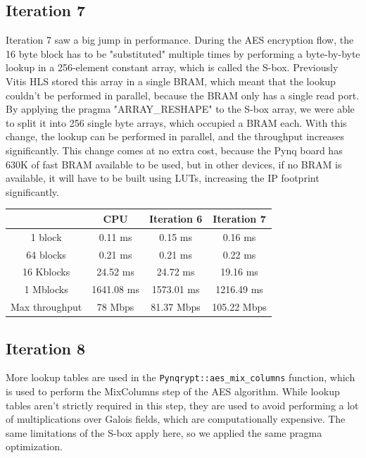 \documentclass[12pt,oneside,a4paper]{article}
\begin{document}
\subsection{Iteration 7} \label{subsec:iter7}
Iteration 7 saw a big jump in performance. 
During the AES encryption flow, the 16 byte block has to be "substituted" multiple times by performing a byte-by-byte lookup in a 256-element constant array, which is called the S-box.
Previously Vitis HLS stored this array in a single BRAM, which meant that the lookup couldn't be performed in parallel, because the BRAM only has a single read port.
By applying the pragma "ARRAY\_RESHAPE" to the S-box array, we were able to split it into 256 single byte arrays, which occupied a BRAM each. With this change, the lookup can be performed in parallel, and the throughput increases significantly.
This change comes at no extra cost, because the Pynq board has 630K of fast BRAM available to be used, but in other devices, if no BRAM is available, it will have to be built using LUTs, increasing the IP footprint significantly.

\begin{table}[h!]
	\centering
	\begin{tabular}{cccc}
		\toprule
		 & CPU & Iteration 6 & Iteration 7 \\
		\midrule
		1 block & 0.11 ms & 0.15 ms & 0.16 ms \\
		64 blocks & 0.21 ms & 0.21 ms & 0.22 ms \\
		16 Kblocks & 24.52 ms & 24.72 ms & 19.16 ms \\
		1 Mblocks & 1641.08 ms & 1573.01 ms & 1216.49 ms \\
		Max throughput & 78 Mbps & 81.37 Mbps & 105.22 Mbps \\
		\bottomrule
	\end{tabular}
\end{table}

\subsection{Iteration 8} \label{subsec:iter8}
More lookup tables are used in the {\tt Pynqrypt::aes\_mix\_columns} function, which is used to perform the MixColumns step of the AES algorithm.
While lookup tables aren't strictly required in this step, they are used to avoid performing a lot of multiplications over Galois fields, which are computationally expensive.
The same limitations of the S-box apply here, so we applied the same pragma optimization.
\end{document}
